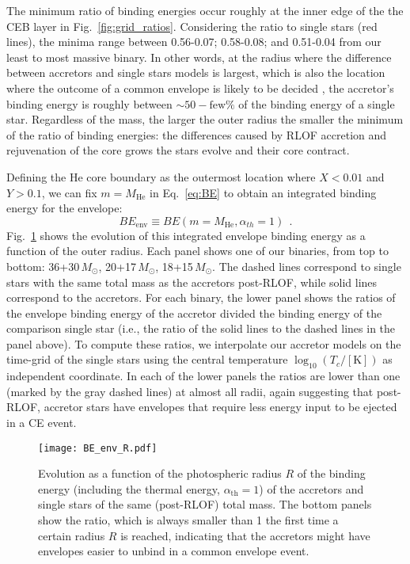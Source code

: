 \documentclass[twocolumn,twocolappendix,trackchanges]{aastex63}
\DeclareRobustCommand{\Eqref}[1]{Eq.~\ref{#1}}
\DeclareRobustCommand{\Figref}[1]{Fig.~\ref{#1}}
\begin{document}
The minimum ratio of binding energies occur roughly at the inner edge
of the the CEB layer in \Figref{fig:grid_ratios}. Considering the
ratio to single stars (red lines), the minima range between 0.56-0.07;
0.58-0.08; and 0.51-0.04 from our least to most massive binary. In
other words, at the radius where the difference between accretors and
single stars models is largest, which is also the location where the
outcome of a common envelope is likely to be decided \citep[e.g.,][]{ivanova:2013}, the accretor's
binding energy is roughly between $\sim{}50-\mathrm{few}\%$ of the
binding energy of a single star. Regardless of the mass, the larger
the outer radius the smaller the minimum of the ratio of binding
energies: the differences caused by RLOF accretion and rejuvenation of
the core grows the stars evolve and their core contract.

Defining the He core boundary as the outermost location where $X<0.01$
and $Y>0.1$, we can fix $m=M_\mathrm{He}$ in \Eqref{eq:BE} to obtain
an integrated binding energy for the envelope:
\begin{equation}
  \label{eq:BE_env}
  BE_\mathrm{env} \equiv BE(m=M_\mathrm{He}, \alpha_{th}=1) \ \ .
\end{equation}
\Figref{fig:BE_env_R} shows the evolution of this integrated envelope
binding energy as a function of the outer radius. Each panel shows one
of our binaries, from top to bottom: 36+30\,$M_\odot$,
20+17\,$M_\odot$, 18+15\,$M_\odot$. The dashed lines correspond to
single stars with the same total mass as the accretors post-RLOF,
while solid lines correspond to the accretors. For each binary, the
lower panel shows the ratios of the envelope binding energy of the
accretor divided the binding energy of the comparison single star
(i.e., the ratio of the solid lines to the dashed lines in the panel
above). To compute these ratios, we interpolate our accretor models
on the time-grid of the single stars using the central temperature
$\log_{10}(T_c/[\mathrm{K}])$ as independent coordinate. In each of
the lower panels the ratios are lower than one (marked by the gray
dashed lines) at almost all radii, again suggesting that post-RLOF,
accretor stars have envelopes that require less energy input to be
ejected in a CE event.

\begin{figure}[tp]
  \centering
  \texttt{[image: BE\_env\_R.pdf]}
  \caption{Evolution as a function of the photospheric radius $R$ of
    the binding energy (including the thermal
    energy, $\alpha_\mathrm{th}=1$) of the accretors and single stars
    of the same (post-RLOF) total mass. The bottom panels show the
    ratio, which is always smaller than 1 the first time a certain
    radius $R$ is reached, indicating that the
    accretors might have envelopes easier to unbind in a common
    envelope event.}
  \label{fig:BE_env_R}
\end{figure}
\end{document}
